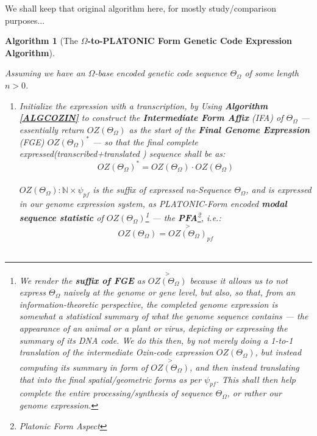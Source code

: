 \documentclass[a4paper, 18pt]{book} %
\newtheorem{alg}{Algorithm}
\begin{document}
\begin{appendices}
We shall keep that original algorithm here, for mostly study/comparison purposes...

\begin{alg}[The \textbf{$\Omega$-to-PLATONIC Form Genetic Code Expression Algorithm}]
\label{ALGCOZINPLATO_ORIG}

Assuming we have an $\Omega$-base encoded genetic code sequence $\Theta_\Omega$ of some length $n > 0$.

\begin{enumerate}
\item{Initialize the expression with a transcription, by Using \textbf{Algorithm \ref{ALGCOZIN}} to construct the \textbf{Intermediate Form Affix} (IFA) of $\Theta_\Omega$ --- essentially return $OZ(\Theta_\Omega)$ as the start of the \textbf{Final Genome Expression} (FGE) $\boxed{OZ(\Theta_\Omega)}^*$ --- so that the final complete expressed(transcribed+translated ) sequence shall be as:\\

\begin{equation}
\label{EQTRANSLGENSEQ_ORIG}
\boxed{OZ(\Theta_\Omega)}^* = OZ(\Theta_\Omega)\cdot\boxed{OZ(\Theta_\Omega)}
\end{equation}\\

$\boxed{OZ(\Theta_\Omega)}: \mathbb{N} \times \psi_{pf}$ is the suffix of expressed na-Sequence $\Theta_\Omega$, and is expressed in our genome expression system, as PLATONIC-Form encoded \textbf{modal sequence statistic} of $OZ(\Theta_\Omega)$\footnote{We render the \textbf{suffix of FGE} as $\overset{>}{OZ(\Theta_\Omega)}$ because it allows us to not express $\Theta_\Omega$ naively at the genome or gene level, but also, so that, from an information-theoretic perspective, the completed genome expression is somewhat a statistical summary of what the genome sequence contains --- the appearance of an animal or a plant or virus, depicting or expressing the summary of its DNA code. We do this then, by not merely doing a 1-to-1 translation of the intermediate Ozin-code expression $OZ(\Theta_\Omega)$, but instead computing its summary in form of $\overset{>}{OZ(\Theta_\Omega)}$, and then instead translating that into the final spatial/geometric forms as per $\psi_{pf}$. This shall then help complete the entire processing/synthesis of sequence $\Theta_\Omega$, or rather our genome expression.} --- the \textbf{PFA}\footnote{Platonic Form Aspect}, i.e.:\\

\begin{equation}
 \boxed{OZ(\Theta_\Omega)} = \boxed{\overset{>}{OZ(\Theta_\Omega)}}_{pf}
\end{equation}\\


}
\end{enumerate}
\end{alg}
\end{appendices}
\end{document}

